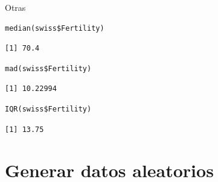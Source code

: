 \documentclass[xcolor={usenames,svgnames,dvipsnames}]{beamer}
\begin{document}
\begin{frame}[fragile,label=sec-2-4]{Otras}
 \lstset{language=R,label= ,caption= ,numbers=none}
\begin{lstlisting}
median(swiss$Fertility)
\end{lstlisting}

\begin{verbatim}
[1] 70.4
\end{verbatim}

\lstset{language=R,label= ,caption= ,numbers=none}
\begin{lstlisting}
mad(swiss$Fertility)
\end{lstlisting}

\begin{verbatim}
[1] 10.22994
\end{verbatim}

\lstset{language=R,label= ,caption= ,numbers=none}
\begin{lstlisting}
IQR(swiss$Fertility)
\end{lstlisting}

\begin{verbatim}
[1] 13.75
\end{verbatim}
\end{frame}

\section{Generar datos aleatorios}
\label{sec-3}
\end{document}
